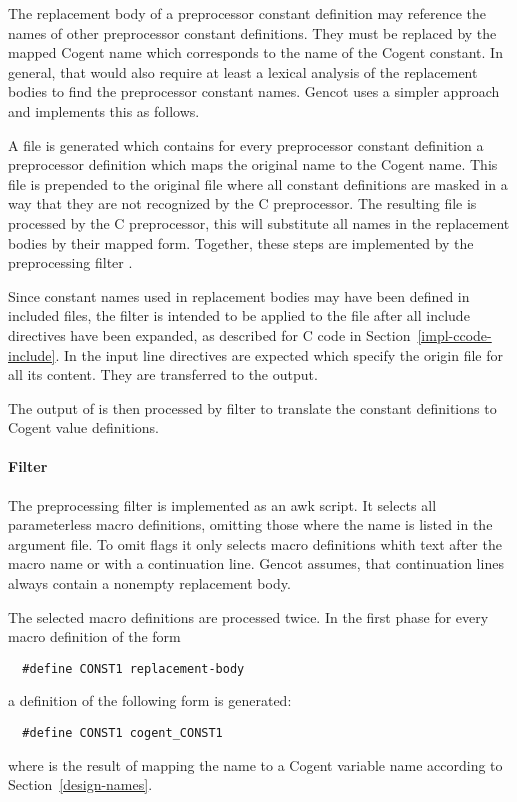 The replacement body of a preprocessor constant definition may reference the names of other preprocessor
constant definitions. They must be replaced by the mapped Cogent name which corresponds to the name of
the Cogent constant. In general, that would also require at least a lexical analysis of the replacement
bodies to find the preprocessor constant names. Gencot uses a simpler approach and implements this as follows.

A file is generated which contains for every preprocessor constant definition a preprocessor definition 
which maps the original name to the Cogent name. This file is prepended to the original file where all
constant definitions are masked in a way that they are not recognized by the C preprocessor.
The resulting file is processed by the C preprocessor, this will substitute all names in the replacement 
bodies by their mapped form. Together, these steps are implemented by the preprocessing filter 
.

Since constant names used in replacement bodies may have been defined in included files, the filter
 is intended to be applied to the file after all include directives have been 
expanded, as described for C code in Section~\ref{impl-ccode-include}. In the input line directives
are expected which specify the origin file for all its content. They are transferred to the output.

The output of  is then processed by
filter  to translate the constant definitions to Cogent value definitions.

\paragraph{Filter }

The preprocessing filter is implemented as an awk script. It selects all parameterless macro definitions,
omitting those where the name is listed in the argument file. To omit flags it only selects macro 
definitions whith text after the macro name or with a continuation line. Gencot assumes, that continuation
lines always contain a nonempty replacement body.

The selected macro definitions are processed twice. In the first phase for every macro definition of the
form
\begin{verbatim}
  #define CONST1 replacement-body
\end{verbatim}
a definition of the following form is generated:
\begin{verbatim}
  #define CONST1 cogent_CONST1
\end{verbatim}
where  is the result of mapping the name  to a Cogent variable name
according to Section~\ref{design-names}.

